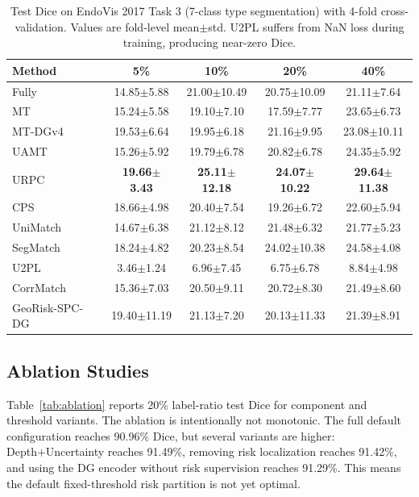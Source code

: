 \documentclass[journal]{IEEEtran}
\begin{document}
\begin{table}[t]
\caption{Test Dice on EndoVis 2017 Task 3 (7-class type segmentation) with 4-fold cross-validation. Values are fold-level mean$\pm$std. U2PL suffers from NaN loss during training, producing near-zero Dice.}
\label{tab:task3_results}
\centering
\scriptsize
\begin{tabular}{lcccc}
\toprule
Method & 5\% & 10\% & 20\% & 40\% \\
\midrule
Fully & 14.85{\tiny$\pm$5.88} & 21.00{\tiny$\pm$10.49} & 20.75{\tiny$\pm$10.09} & 21.11{\tiny$\pm$7.64} \\
MT \cite{tarvainen2017mean} & 15.24{\tiny$\pm$5.58} & 19.10{\tiny$\pm$7.10} & 17.59{\tiny$\pm$7.77} & 23.65{\tiny$\pm$6.73} \\
MT-DGv4 & 19.53{\tiny$\pm$6.64} & 19.95{\tiny$\pm$6.18} & 21.16{\tiny$\pm$9.95} & 23.08{\tiny$\pm$10.11} \\
UAMT \cite{yu2019uncertainty} & 15.26{\tiny$\pm$5.92} & 19.79{\tiny$\pm$6.78} & 20.82{\tiny$\pm$6.78} & 24.35{\tiny$\pm$5.92} \\
URPC \cite{chen2021urpc} & \textbf{19.66{\tiny$\pm$3.43}} & \textbf{25.11{\tiny$\pm$12.18}} & \textbf{24.07{\tiny$\pm$10.22}} & \textbf{29.64{\tiny$\pm$11.38}} \\
CPS \cite{chen2021cps} & 18.66{\tiny$\pm$4.98} & 20.40{\tiny$\pm$7.54} & 19.26{\tiny$\pm$6.72} & 22.60{\tiny$\pm$5.94} \\
UniMatch \cite{yang2023unimatch} & 14.67{\tiny$\pm$6.38} & 21.12{\tiny$\pm$8.12} & 21.48{\tiny$\pm$6.32} & 21.77{\tiny$\pm$5.23} \\
SegMatch \cite{segmatch2025} & 18.24{\tiny$\pm$4.82} & 20.23{\tiny$\pm$8.54} & 24.02{\tiny$\pm$10.38} & 24.58{\tiny$\pm$4.08} \\
U2PL \cite{wang2022u2pl} & 3.46{\tiny$\pm$1.24} & 6.96{\tiny$\pm$7.45} & 6.75{\tiny$\pm$6.78} & 8.84{\tiny$\pm$4.98} \\
CorrMatch \cite{sun2024corrmatch} & 15.36{\tiny$\pm$7.03} & 20.50{\tiny$\pm$9.11} & 20.72{\tiny$\pm$8.30} & 21.49{\tiny$\pm$8.60} \\
\midrule
GeoRisk-SPC-DG & 19.40{\tiny$\pm$11.19} & 21.13{\tiny$\pm$7.20} & 20.13{\tiny$\pm$11.33} & 21.39{\tiny$\pm$8.91} \\
\bottomrule
\end{tabular}
\end{table}

\subsection{Ablation Studies}
Table~\ref{tab:ablation} reports 20\% label-ratio test Dice for component and threshold variants. The ablation is intentionally not monotonic. The full default configuration reaches 90.96\% Dice, but several variants are higher: Depth+Uncertainty reaches 91.49\%, removing risk localization reaches 91.42\%, and using the DG encoder without risk supervision reaches 91.29\%. This means the default fixed-threshold risk partition is not yet optimal.
\end{document}
